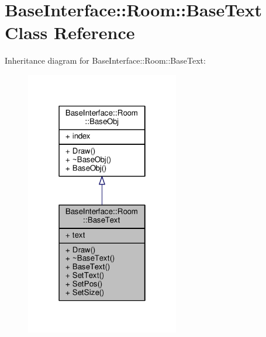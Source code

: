 \hypertarget{classBaseInterface_1_1Room_1_1BaseText}{}\section{Base\+Interface\+:\+:Room\+:\+:Base\+Text Class Reference}
\label{classBaseInterface_1_1Room_1_1BaseText}


Inheritance diagram for Base\+Interface\+:\+:Room\+:\+:Base\+Text\+:
\nopagebreak
\begin{figure}[H]
\begin{center}
\leavevmode
\includegraphics[width=190pt]{d2/d18/classBaseInterface_1_1Room_1_1BaseText__inherit__graph}
\end{center}
\end{figure}


